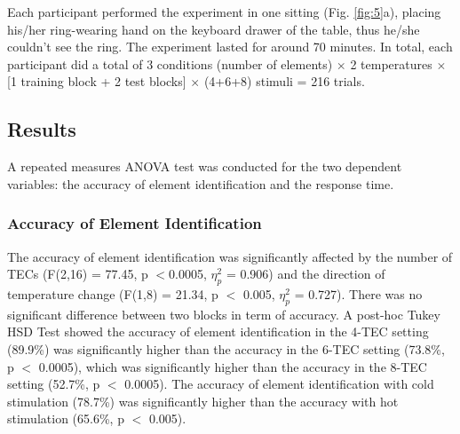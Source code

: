 \documentclass[preprint,12pt]{elsarticle}
\begin{document}
Each participant performed the experiment in one sitting (Fig. \ref{fig:5}a), placing his/her ring-wearing hand on the keyboard drawer of the table, thus he/she couldn't see the ring. The experiment lasted for around 70 minutes. In total, each participant did a total of 3 conditions (number of elements) $\times$ 2 temperatures $\times$ [1 training block + 2 test blocks] $\times$ (4+6+8) stimuli = 216 trials.



\subsection{Results}
A repeated measures ANOVA test was conducted for the two dependent variables: the accuracy of element identification and the response time.

\subsubsection{Accuracy of Element Identification}
The accuracy of element identification was significantly affected by the number of TECs (F(2,16) = 77.45, p $<$0.0005, $\eta_p^2$ = 0.906) and the direction of temperature change (F(1,8) = 21.34, p $<$ 0.005, $\eta_p^2$ = 0.727). There was no significant difference between two blocks in term of accuracy. A post-hoc Tukey HSD Test showed the accuracy of element identification in the 4-TEC setting (89.9\%) was significantly higher than the accuracy in the 6-TEC setting (73.8\%, p $<$ 0.0005), which was significantly higher than the accuracy in the 8-TEC setting (52.7\%, p $<$ 0.0005). The accuracy of element identification with cold stimulation (78.7\%) was significantly higher than the accuracy with hot stimulation (65.6\%, p $<$ 0.005).
\end{document}
